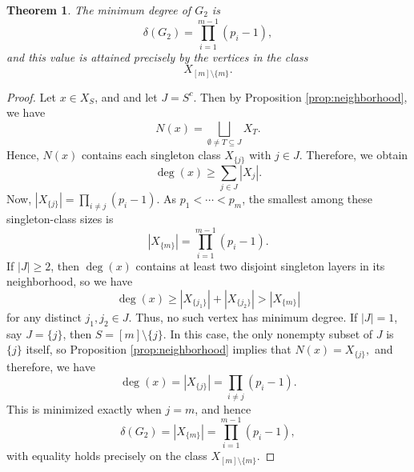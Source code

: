 \documentclass[10pt,a4paper]{amsart}
\newtheorem{theorem}{Theorem}
\begin{document}
	\begin{theorem}\label{thm:mindegree}
		The minimum degree of $G_2$ is
		$$
		\delta(G_2)=\prod_{i=1}^{m-1}(p_i-1),
		$$
		and this value is attained precisely by the vertices in the class
		$$
		X_{[m]\setminus\{m\}}.
		$$
	\end{theorem}

	\begin{proof}
		Let $x\in X_S$, and and let $J=S^c$. Then by Proposition \ref{prop:neighborhood}, we have
		$$
		N(x)=\bigsqcup_{\emptyset\neq T\subseteq J}X_T.
		$$
		Hence, $N(x)$ contains each singleton class $X_{\{j\}}$ with $j\in J$. Therefore, we obtain
		$$
		\deg(x)\geq \sum_{j\in J}|X_{{j}}|.
		$$
		Now, $ |X_{\{j\}}|=\prod_{i\neq j}(p_i-1). $ As $p_1<\cdots<p_m$, the smallest among these singleton-class sizes is
		$$
		|X_{\{m\}}|=\prod_{i=1}^{m-1}(p_i-1).
		$$
		 If $|J|\geq 2$, then $\deg(x)$ contains at least two disjoint singleton layers in its neighborhood, so we have
		$$
		\deg(x)\geq |X_{\{j_1\}}|+|X_{\{j_2\}}|>|X_{\{m\}}|
		$$
		for any distinct $j_1,j_2\in J$. Thus,  no such vertex has minimum degree. If $|J|=1$, say $J=\{j\}$, then $S=[m]\setminus\{j\}$. In this case, the only nonempty subset of $J$ is $\{j\}$ itself, so Proposition \ref{prop:neighborhood} implies that $N(x)=X_{\{j\}},$ 	and therefore, we have
		$$
		\deg(x)=|X_{\{j\}}|=\prod_{i\neq j}(p_i-1).
		$$
		This is minimized exactly when $j=m$, and hence
		$$
		\delta(G_2)=|X_{\{m\}}|=\prod_{i=1}^{m-1}(p_i-1),
		$$
		with equality holds precisely on the class $X_{[m]\setminus\{m\}}$.
	\end{proof}
\end{document}
